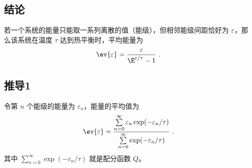 
\begin{issues}
\issueDraft
\end{issues}



\subsection{结论}
若一个系统的能量只能取一系列离散的值（能级），但相邻能级间距恰好为 $\varepsilon$，那么该系统在温度 $\tau$ 达到热平衡时，平均能量为
\begin{equation}
\ev{\varepsilon} = \frac{\varepsilon}{\E^{\varepsilon/\tau} - 1}~.
\end{equation}

\subsection{推导1}
令第 $n$ 个能级的能量为 $\varepsilon_n$，能量的平均值为
\begin{equation}\label{eq_EqCE_2}
\ev{\varepsilon} = \frac{\sum\limits_{n = 0}^\infty  \varepsilon_n \exp(-\varepsilon_n/\tau)}{\sum\limits_{n = 0}^\infty \exp(-\varepsilon_n/\tau)}~.
\end{equation}
其中 $\sum\limits_{n = 0}^\infty \exp(-\varepsilon_n/\tau)$ 就是配分函数 $Q$。

